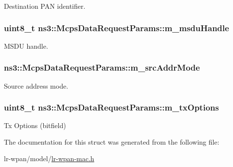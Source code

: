 Destination P\+AN identifier. 

\subsubsection[{\texorpdfstring{m\+\_\+msdu\+Handle}{m_msduHandle}}]{\setlength{\rightskip}{0pt plus 5cm}uint8\+\_\+t ns3\+::\+Mcps\+Data\+Request\+Params\+::m\+\_\+msdu\+Handle}\hypertarget{structns3_1_1McpsDataRequestParams_a90a54f9a082876ebe872538c8b1ce6bc}{}\label{structns3_1_1McpsDataRequestParams_a90a54f9a082876ebe872538c8b1ce6bc}


M\+S\+DU handle. 

\subsubsection[{\texorpdfstring{m\+\_\+src\+Addr\+Mode}{m_srcAddrMode}}]{ ns3\+::\+Mcps\+Data\+Request\+Params\+::m\+\_\+src\+Addr\+Mode}\hypertarget{structns3_1_1McpsDataRequestParams_a31f4c281d07cf3b5992d45416bd71309}{}\label{structns3_1_1McpsDataRequestParams_a31f4c281d07cf3b5992d45416bd71309}


Source address mode. 

\subsubsection[{\texorpdfstring{m\+\_\+tx\+Options}{m_txOptions}}]{\setlength{\rightskip}{0pt plus 5cm}uint8\+\_\+t ns3\+::\+Mcps\+Data\+Request\+Params\+::m\+\_\+tx\+Options}\hypertarget{structns3_1_1McpsDataRequestParams_ad20ec674a277222812523b3ebbc18d4c}{}\label{structns3_1_1McpsDataRequestParams_ad20ec674a277222812523b3ebbc18d4c}


Tx Options (bitfield) 



The documentation for this struct was generated from the following file\+:\begin{DoxyCompactItemize}
\item 
lr-\/wpan/model/\hyperlink{lr-wpan-mac_8h}{lr-\/wpan-\/mac.\+h}\end{DoxyCompactItemize}
